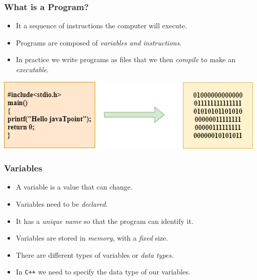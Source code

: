 \documentclass{beamer}
\begin{document}
\begin{frame}
	\frametitle{What is a Program?}

	\begin{itemize}
		\item It a sequence of instructions the computer will execute.
		\item Programs are composed of \textit{variables and instructions}.
		\item In practice we write programs as files that we then \textit{compile} to make an \textit{executable}.
	\end{itemize}

	\begin{center}
		\includegraphics[scale=0.5]{images/program}
	\end{center}
\end{frame}

\begin{frame}
	\frametitle{Variables}

	\begin{itemize}
		\item A variable is a value that can change.
		\item Variables need to be \textit{declared}.
		\item It has a \textit{unique name} so that the program can identify it.
		\item Variables are stored in \textit{memory}, with a \textit{fixed} size.
		\item There are different types of variables or \textit{data types}.
		\item In \texttt{C++} we need to specify the data type of our variables.
	\end{itemize}
\end{frame}
\end{document}
